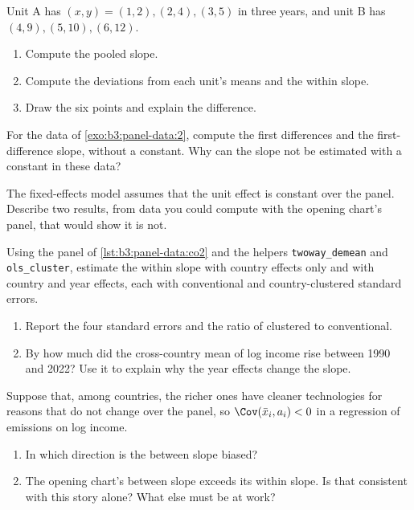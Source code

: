 \begin{exercise}[$\star$]\label{exo:b3:panel-data:2}
Unit A has $(x, y) = (1, 2), (2, 4), (3, 5)$ in three years, and unit B has
$(4, 9), (5, 10), (6, 12)$.
\begin{enumerate}
\item Compute the pooled slope.
\item Compute the deviations from each unit's means and the within slope.
\item Draw the six points and explain the difference.
\end{enumerate}
\end{exercise}

\begin{exercise}[$\star$]\label{exo:b3:panel-data:3}
For the data of \cref{exo:b3:panel-data:2}, compute the first differences and
the first-difference slope, without a constant. Why can the slope not be
estimated with a constant in these data?
\end{exercise}

\begin{exercise}[$\star$]\label{exo:b3:panel-data:4}
The fixed-effects model assumes that the unit effect is constant over the panel.
Describe two results, from data you could compute with the opening chart's
panel, that would show it is not.
\end{exercise}

\begin{exercise}[$\star\star$]\label{exo:b3:panel-data:5}
Using the panel of \cref{lst:b3:panel-data:co2} and the helpers
\texttt{twoway\_demean} and \texttt{ols\_cluster}, estimate the within slope with
country effects only and with country and year effects, each with conventional
and country-clustered standard errors.
\begin{enumerate}
\item Report the four standard errors and the ratio of clustered to conventional.
\item By how much did the cross-country mean of log income rise between 1990
and 2022? Use it to explain why the year effects change the slope.
\end{enumerate}
\end{exercise}

\begin{exercise}[$\star\star$]\label{exo:b3:panel-data:6}
Suppose that, among countries, the richer ones have cleaner technologies for
reasons that do not change over the panel, so $\Cov(\bar x_i, a_i) < 0$ in a
regression of emissions on log income.
\begin{enumerate}
\item In which direction is the between slope biased?
\item The opening chart's between slope exceeds its within slope. Is that
consistent with this story alone? What else must be at work?
\end{enumerate}
\end{exercise}

